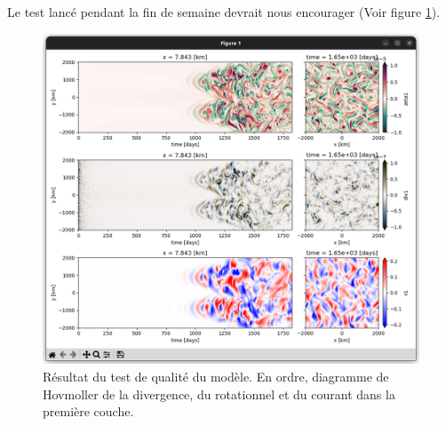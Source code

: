 \documentclass[10pt]{article}
\numberwithin{equation}{section}
\begin{document}
Le test lancé pendant la fin de semaine devrait nous encourager (Voir figure \ref{fig:orgd4708c8}).

\begin{figure}[htbp]
\centering
\includegraphics[width=.9\linewidth]{figures/tests/test_SW_2023-03-18.png}
\caption{\label{fig:orgd4708c8}Résultat du test de qualité du modèle. En ordre, diagramme de Hovmoller de la divergence, du rotationnel et du courant dans la première couche.}
\end{figure}
\end{document}

